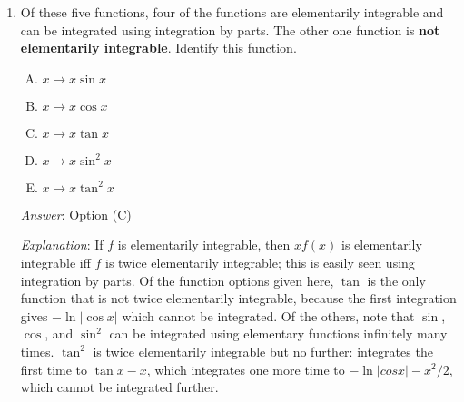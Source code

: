 \documentclass[10pt]{amsart}
\begin{document}
\begin{enumerate}
  \begin{enumerate}[(A)]
  \item $1$
  \item $2$
  \item $3$
  \item $4$
  \item $5$
  \end{enumerate}

  {\em Answer}: Option (C)

  {\em Explanation}: Via the $u$-substitution $u = x^{1/k}$, we get
  $\int ku^{k-1}f(u) \, du$. Now using the previous question, the
  maximum value of $k - 1$ possible is $2$, so the maximum possible
  value is $3$.

  We can also do a direct integration by parts taking $1$ as the
  second part.

  {\em Performance review}: $8$ out of $18$ people got this
  correct. $5$ chose (A), $3$ chose (D), and $2$ chose (B).

  {\em Historical note}: This question appeared in a 153 quiz. At the
  time, $14$ out of $27$ people got this correct. $4$ people chose (D),
  $4$ people chose (B), $3$ people chose (A), $1$ person chose (E),
  and $1$ person left the question blank.
  
\item Of these five functions, four of the functions are elementarily
  integrable and can be integrated using integration by parts. The
  other one function is {\bf not elementarily integrable}. Identify
  this function.

  \begin{enumerate}[(A)]
  \item $x \mapsto x \sin x$
  \item $x \mapsto x \cos x$
  \item $x \mapsto x \tan x$
  \item $x \mapsto x \sin^2x$
  \item $x \mapsto x \tan^2x$
  \end{enumerate}
  {\em Answer}: Option (C)

  {\em Explanation}: If $f$ is elementarily integrable, then $xf(x)$
  is elementarily integrable iff $f$ is twice elementarily integrable;
  this is easily seen using integration by parts. Of the function
  options given here, $\tan$ is the only function that is not twice
  elementarily integrable, because the first integration gives
  $-\ln|\cos x|$ which cannot be integrated. Of the others, note that
  $\sin$, $\cos$, and $\sin^2$ can be integrated using elementary
  functions infinitely many times. $\tan^2$ is twice elementarily
  integrable but no further: integrates the first time to $\tan x -
  x$, which integrates one more time to $-\ln|cos x| - x^2/2$, which
  cannot be integrated further.


\end{enumerate}
\end{document}
